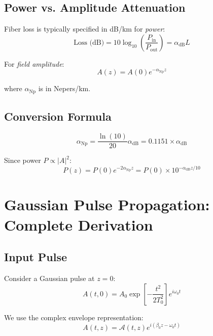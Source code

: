 \documentclass[12pt,a4paper]{article}
\begin{document}
\subsection{Power vs. Amplitude Attenuation}

Fiber loss is typically specified in dB/km for \textit{power}:
\begin{equation}
\text{Loss (dB)} = 10 \log_{10}\left(\frac{P_{\text{in}}}{P_{\text{out}}}\right) = \alpha_{\text{dB}} L
\end{equation}

For \textit{field amplitude}:
\begin{equation}
A(z) = A(0) e^{-\alpha_{\text{Np}} z}
\end{equation}

where $\alpha_{\text{Np}}$ is in Nepers/km.

\subsection{Conversion Formula}

\begin{equation}
\alpha_{\text{Np}} = \frac{\ln(10)}{20} \alpha_{\text{dB}} = 0.1151 \times \alpha_{\text{dB}} \label{eq:dB_to_Np}
\end{equation}

Since power $P \propto |A|^2$:
\begin{equation}
P(z) = P(0) e^{-2\alpha_{\text{Np}} z} = P(0) \times 10^{-\alpha_{\text{dB}} z/10}
\end{equation}

\section{Gaussian Pulse Propagation: Complete Derivation}

\subsection{Input Pulse}

Consider a Gaussian pulse at $z = 0$:
\begin{equation}
A(t, 0) = A_0 \exp\left[-\frac{t^2}{2T_0^2}\right] e^{i\omega_0 t} \label{eq:gaussian_input}
\end{equation}

We use the complex envelope representation:
\begin{equation}
A(t, z) = \mathcal{A}(t, z) e^{i(\beta_0 z - \omega_0 t)}
\end{equation}
\end{document}
